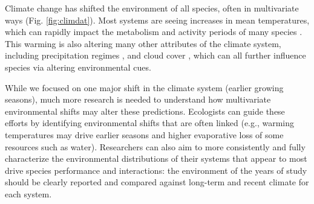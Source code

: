 \documentclass[11pt,letterpaper]{article}
\begin{document}
Climate change has shifted the environment of all species, often in multivariate ways (Fig. \ref{fig:climdat}). Most systems are seeing increases in mean temperatures, which can rapidly impact the metabolism and activity periods of many species \citep{Monson:2006vt,IPCC:2014sm}. This warming is also altering many other attributes of the climate system, including precipitation regimes \citep{Diffenbaugh2015}, and cloud cover \citep{hofer2017}, which can all further influence species via altering environmental cues. 




While we focused on one major shift in the climate system (earlier growing seasons), much more research is needed to understand how multivariate environmental shifts may alter these predictions. Ecologists can guide these efforts by identifying environmental shifts that are often linked (e.g., warming temperatures may drive earlier seasons and higher evaporative loss of some resources such as water). Researchers can also aim to more consistently and fully characterize the environmental distributions of their systems that appear to most drive species performance and interactions: the environment of the years of study should be clearly reported and compared against long-term and recent climate for each system.\\
\end{document}
